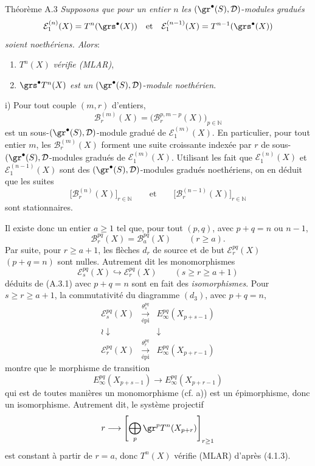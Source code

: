 \begin{statement}{Théorème A.3}
\emph{Supposons que pour un entier} \(n\) \emph{les} \((\gr^\bullet(S),\mathcal{D})\)-\emph{modules gradués}
\[
\mathcal{E}_1^{(n)}(X)=T^n(\grs^\bullet(X))
\quad\text{et}\quad
\mathcal{E}_1^{(n-1)}(X)=T^{n-1}(\grs^\bullet(X))
\]
\emph{soient noethériens. Alors}:
\begin{enumerate}[label=\textup{(\roman*)}]
\item \(T^n(X)\) \emph{vérifie (MLAR)},
\item \(\grs^\bullet T^n(X)\) \emph{est un} \((\gr^\bullet(S),\mathcal{D})\)-\emph{module noethérien}.
\end{enumerate}
\end{statement}

\begin{prooftext}

i) Pour tout couple \((m,r)\) d'entiers,
\[
\mathcal{B}_r^{(m)}(X)=\bigl(\mathcal{B}_r^{p,m-p}(X)\bigr)_{p\in\mathbb{N}}
\]
est un sous-\((\gr^\bullet(S),\mathcal{D})\)-module gradué de \(\mathcal{E}_1^{(m)}(X)\). En particulier, pour tout entier \(m\), les \(\mathcal{B}_r^{(m)}(X)\) forment une suite croissante indexée par \(r\) de sous-\((\gr^\bullet(S),\mathcal{D}\)-modules gradués de \(\mathcal{E}_1^{(m)}(X)\). Utilisant les fait que \(\mathcal{E}_1^{(n)}(X)\) et \(\mathcal{E}_1^{(n-1)}(X)\) sont des \((\gr^\bullet(S),\mathcal{D})\)-modules gradués noethériens, on en déduit que les suites
\[
\bigl[\mathcal{B}_r^{(n)}(X)\bigr]_{r\in\mathbb{N}}
\qquad\text{et}\qquad
\bigl[\mathcal{B}_r^{(n-1)}(X)\bigr]_{r\in\mathbb{N}}
\]
sont stationnaires.

Il
existe donc un entier \(a\ge1\) tel que, pour tout \((p,q)\), avec \(p+q=n\) ou \(n-1\),
\begin{equation}
\mathcal{B}_r^{pq}(X)=\mathcal{B}_a^{pq}(X)\qquad(r\ge a).
\tag{A.3.1}
\end{equation}
Par suite, pour \(r\ge a+1\), les flèches \(d_r\) de source et de but \(\mathcal{E}_r^{pq}(X)\) \((p+q=n)\) sont nulles. Autrement dit les monomorphismes
\[
\mathcal{E}_s^{pq}(X)\hookrightarrow\mathcal{E}_r^{pq}(X)\qquad(s\ge r\ge a+1)
\]
déduits de (A.3.1) avec \(p+q=n\) sont en fait des \emph{isomorphismes}. Pour \(s\ge r\ge a+1\), la commutativité du diagramme \((d_3)\), avec \(p+q=n\),
\[
\begin{array}{ccc}
\mathcal{E}_s^{pq}(X)&\xrightarrow[\text{épi}]{\theta_s^{pq}}&E_\infty^{pq}(X_{p+s-1})\\
\wr\downarrow&&\downarrow\\
\mathcal{E}_r^{pq}(X)&\xrightarrow[\text{épi}]{\theta_r^{pq}}&E_\infty^{pq}(X_{p+r-1})
\end{array}
\]
montre que le morphisme de transition
\[
E_\infty^{pq}(X_{p+s-1})\longrightarrow E_\infty^{pq}(X_{p+r-1})
\]
qui est de toutes manières un monomorphisme (cf. a)) est un épimorphisme, donc un isomorphisme. Autrement dit, le système projectif
\[
r\longrightarrow\left[\bigoplus_p\gr^p T^n(X_{p+r})\right]_{r\ge1}
\]
est constant à partir de \(r=a\), donc \(T^n(X)\) vérifie (MLAR) d'après (4.1.3).


\end{prooftext}
